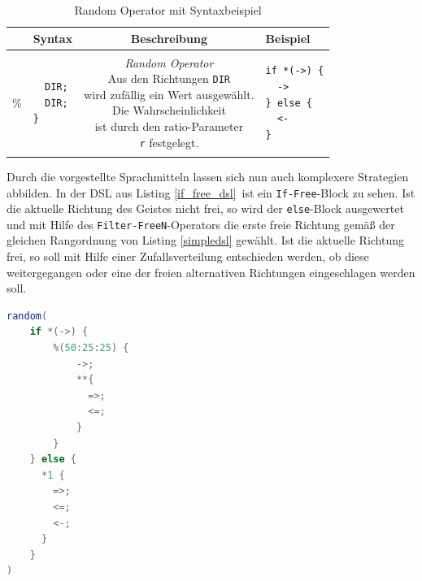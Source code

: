 \documentclass[conference]{IEEEtran}
\begin{document}
\begin{table}[!htb]
\caption{Random Operator mit Syntaxbeispiel}
\label{random_op}
\centering
\setlength\tabcolsep{1.5pt}
\begin{tabular}{|c||l|c|l|}
\hline
& \textbf{Syntax} & \textbf{Beschreibung} & \textbf{Beispiel}\\

\hline
\% &

\begin{lstlisting}[basicstyle=\scriptsize\ttfamily]
%(r:r) {
  DIR;
  DIR;
}
\end{lstlisting} &

\makecell{\textit{Random Operator}\\
Aus den Richtungen \texttt{DIR}\\ wird zufällig
ein Wert ausgewählt.\\ Die Wahrscheinlichkeit\\
ist durch den ratio-Parameter \\
\texttt{r} festgelegt.} &

\begin{lstlisting}[basicstyle=\scriptsize\ttfamily]
if *(->) {
  ->
} else {
  <-
}
\end{lstlisting} \\
\hline

\end{tabular}
\end{table}

Durch die vorgestellte Sprachmitteln lassen sich nun auch komplexere Strategien abbilden. In der DSL aus Listing \ref{if_free_dsl} ist ein \texttt{If-Free}-Block zu sehen. Ist die aktuelle Richtung des Geistes nicht frei, so wird der \texttt{else}-Block ausgewertet und mit Hilfe des \texttt{Filter-FreeN}-Operators die erste freie Richtung gemäß der gleichen Rangordnung von Listing \ref{simpledsl} gewählt. Ist die aktuelle Richtung frei, so soll mit Hilfe einer Zufallsverteilung entschieden werden, ob diese weitergegangen oder eine der freien alternativen Richtungen eingeschlagen werden soll.

\begin{lstlisting}[language=Java, captionpos=b, caption=AI DSL mit \texttt{If-Free}-Block und Zufallsverteilung, label=if_free_dsl]
random(
    if *(->) {
        %(50:25:25) {
            ->;
            **{
              =>;
              <=;
            }
        }
    } else {
      *1 {
        =>;
        <=;
        <-;
      }
    }
)
\end{lstlisting}
\end{document}
